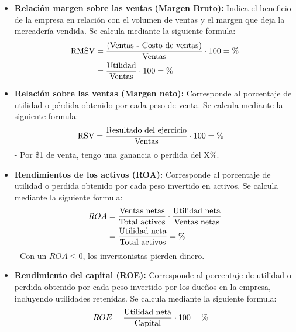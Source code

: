 \documentclass{templateNote}
\begin{document}
\begin{itemize}
    \item \textbf{Relación margen sobre las ventas (Margen Bruto):} Indica el beneficio de la empresa en relación con el volumen de ventas y el margen que deja la mercadería vendida. Se calcula mediante la siguiente formula:
    \begin{align*}
        \textnormal{RMSV} &= \frac{\textnormal{(\textnormal{Ventas} - \textnormal{Costo de ventas})}}{\textnormal{Ventas}} \cdot 100 = \% \\
        &= \frac{\textnormal{Utilidad}}{\textnormal{Ventas}} \cdot 100 = \%
    \end{align*}
    \item \textbf{Relación sobre las ventas (Margen neto):} Corresponde al porcentaje de utilidad o pérdida obtenido por cada peso de venta. Se calcula mediante la siguiente formula: 
    \begin{align*}
        \textnormal{RSV} &= \frac{\textnormal{Resultado del ejercicio}}{\textnormal{Ventas}} \cdot 100 = \%
    \end{align*}
    - Por \$1 de venta, tengo una ganancia o perdida del X\%.
    \item \textbf{Rendimientos de los activos (ROA):} Corresponde al porcentaje de utilidad o perdida obtenido por cada peso invertido en activos. Se calcula mediante la siguiente formula:
    \begin{align*}
        ROA &= \frac{\textnormal{Ventas netas}}{\textnormal{Total activos}} \cdot \frac{\textnormal{Utilidad neta}}{\textnormal{Ventas netas}}\\ 
        &= \frac{\textnormal{Utilidad neta}}{\textnormal{Total activos}} = \%
    \end{align*}
    - Con un $ROA \leq 0$, los inversionistas pierden dinero. 
    \item \textbf{Rendimiento del capital (ROE):} Corresponde al porcentaje de utilidad o perdida obtenido por cada peso invertido por los dueños en la empresa, incluyendo utilidades retenidas. Se calcula mediante la siguiente formula:
    \begin{align*}
        ROE &= \frac{\textnormal{Utilidad neta}}{\textnormal{Capital}} \cdot 100 = \%
    \end{align*}
\end{itemize}
\end{document}
